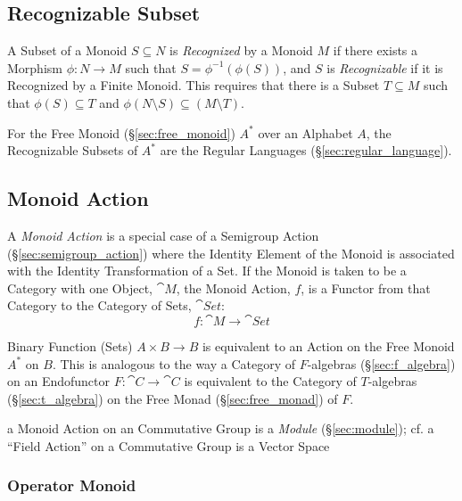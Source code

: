\subsection{Recognizable Subset}\label{sec:recognizable}

A Subset of a Monoid $S \subseteq N$ is \emph{Recognized} by a Monoid $M$ if
there exists a Morphism $\phi : N \rightarrow M$ such that $S =
\phi^{-1}(\phi(S))$, and $S$ is \emph{Recognizable} if it is Recognized by a
Finite Monoid. This requires that there is a Subset $T \subseteq M$ such that
$\phi(S) \subseteq T$ and $\phi(N \setminus S) \subseteq (M \setminus T)$.

For the Free Monoid (\S\ref{sec:free_monoid}) $A^*$ over an Alphabet
$A$, the Recognizable Subsets of $A^*$ are the Regular Languages
(\S\ref{sec:regular_language}).



\subsection{Monoid Action}\label{sec:monoid_action}

A \emph{Monoid Action} is a special case of a Semigroup Action
(\S\ref{sec:semigroup_action}) where the Identity Element of the Monoid is
associated with the Identity Transformation of a Set. If the Monoid is taken to
be a Category with one Object, $\cat{M}$, the Monoid Action, $f$, is a Functor
from that Category to the Category of Sets, $\cat{Set}$:
\[
  f : \cat{M} \rightarrow \cat{Set}
\]

Binary Function (Sets) $A \times B \rightarrow B$ is equivalent to an Action on
the Free Monoid $A^*$ on $B$. This is analogous to the way a Category of
$F$-algebras (\S\ref{sec:f_algebra}) on an Endofunctor $F : \cat{C} \rightarrow
\cat{C}$ is equivalent to the Category of $T$-algebras (\S\ref{sec:t_algebra})
on the Free Monad (\S\ref{sec:free_monad}) of $F$.

a Monoid Action on an Commutative Group is a \emph{Module} (\S\ref{sec:module});
cf. a ``Field Action'' on a Commutative Group is a Vector Space



\subsubsection{Operator Monoid}\label{sec:operator_monoid}

